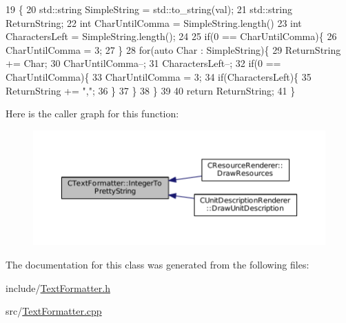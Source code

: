 \begin{DoxyCode}
19                                                       \{
20     std::string SimpleString = std::to\_string(val);
21     std::string ReturnString;
22     \textcolor{keywordtype}{int} CharUntilComma = SimpleString.length() %
23     \textcolor{keywordtype}{int} CharactersLeft = SimpleString.length();
24     
25     \textcolor{keywordflow}{if}(0 == CharUntilComma)\{
26         CharUntilComma = 3;    
27     \}
28     \textcolor{keywordflow}{for}(\textcolor{keyword}{auto} Char : SimpleString)\{
29         ReturnString += Char; 
30         CharUntilComma--;
31         CharactersLeft--;
32         \textcolor{keywordflow}{if}(0 == CharUntilComma)\{
33             CharUntilComma = 3;
34             \textcolor{keywordflow}{if}(CharactersLeft)\{
35                 ReturnString += \textcolor{stringliteral}{","};
36             \}
37         \}
38     \}
39     
40     \textcolor{keywordflow}{return} ReturnString;
41 \}
\end{DoxyCode}
Here is the caller graph for this function\+:
\nopagebreak
\begin{figure}[H]
\begin{center}
\leavevmode
\includegraphics[width=350pt]{classCTextFormatter_a99cc7219fb635bff88c31f0b906f5db0_icgraph}
\end{center}
\end{figure}


The documentation for this class was generated from the following files\+:\begin{DoxyCompactItemize}
\item 
include/\hyperlink{TextFormatter_8h}{Text\+Formatter.\+h}\item 
src/\hyperlink{TextFormatter_8cpp}{Text\+Formatter.\+cpp}\end{DoxyCompactItemize}
